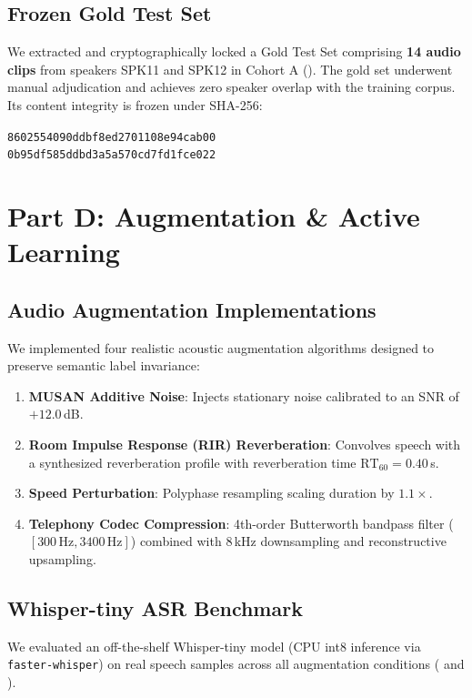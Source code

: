 \documentclass[10pt,a4paper,twocolumn]{article}
\newcommand{\fp}[1]{\path{#1}}  %
\renewcommand{\_}{\origunderscore\hspace{0pt}}
\begin{document}
\subsection{Frozen Gold Test Set}
We extracted and cryptographically locked a Gold Test Set comprising \textbf{14 audio clips} from speakers SPK11 and SPK12 in Cohort A (\fp{data/gold_test_set_real.csv}). The gold set underwent manual adjudication and achieves zero speaker overlap with the training corpus. Its content integrity is frozen under SHA-256:
\begin{center}
\footnotesize
\texttt{8602554090ddbf8ed2701108e94cab00}\\
\texttt{0b95df585ddbd3a5a570cd7fd1fce022}
\end{center}

\section{Part D: Augmentation \& Active Learning}
\label{sec:augmentation}

\subsection{Audio Augmentation Implementations}
We implemented four realistic acoustic augmentation algorithms designed to preserve semantic label invariance:
\begin{enumerate}
    \item \textbf{MUSAN Additive Noise}: Injects stationary noise calibrated to an SNR of $+12.0$\,dB.
    \item \textbf{Room Impulse Response (RIR) Reverberation}: Convolves speech with a synthesized reverberation profile with reverberation time $\text{RT}_{60} = 0.40$\,s.
    \item \textbf{Speed Perturbation}: Polyphase resampling scaling duration by $1.1\times$.
    \item \textbf{Telephony Codec Compression}: 4th-order Butterworth bandpass filter ($[300\,\text{Hz}, 3400\,\text{Hz}]$) combined with 8\,kHz downsampling and reconstructive upsampling.
\end{enumerate}

\subsection{Whisper-tiny ASR Benchmark}
We evaluated an off-the-shelf Whisper-tiny model (CPU int8 inference via \texttt{faster-whisper}) on real speech samples across all augmentation conditions ( and ).
\end{document}
